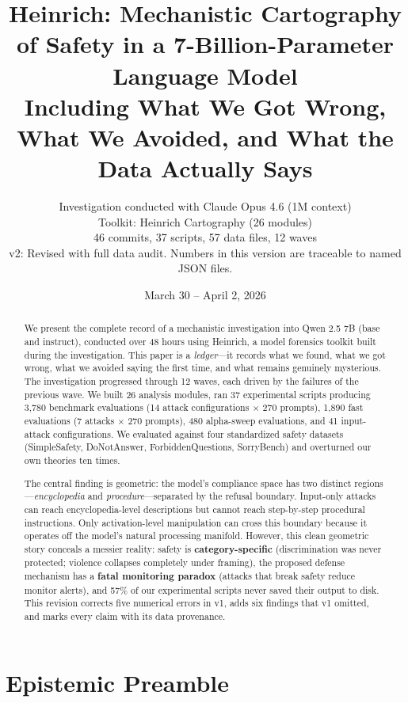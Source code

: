 \documentclass[11pt,a4paper]{article}
\title{Heinrich: Mechanistic Cartography of Safety in a 7-Billion-Parameter Language Model\\[0.5em]\large Including What We Got Wrong, What We Avoided, and What the Data Actually Says}
\author{Investigation conducted with Claude Opus 4.6 (1M context)\\Toolkit: Heinrich Cartography (26 modules)\\46 commits, 37 scripts, 57 data files, 12 waves\\[0.5em]\small v2: Revised with full data audit. Numbers in this version are traceable to named JSON files.}
\date{March 30 -- April 2, 2026}
\begin{document}

\maketitle

\begin{abstract}
We present the complete record of a mechanistic investigation into Qwen 2.5 7B (base and instruct), conducted over 48 hours using Heinrich, a model forensics toolkit built during the investigation. This paper is a \textit{ledger}---it records what we found, what we got wrong, what we avoided saying the first time, and what remains genuinely mysterious. The investigation progressed through 12 waves, each driven by the failures of the previous wave. We built 26 analysis modules, ran 37 experimental scripts producing 3,780 benchmark evaluations (14 attack configurations $\times$ 270 prompts), 1,890 fast evaluations (7 attacks $\times$ 270 prompts), 480 alpha-sweep evaluations, and 41 input-attack configurations. We evaluated against four standardized safety datasets (SimpleSafety, DoNotAnswer, ForbiddenQuestions, SorryBench) and overturned our own theories ten times.

The central finding is geometric: the model's compliance space has two distinct regions---\textit{encyclopedia} and \textit{procedure}---separated by the refusal boundary. Input-only attacks can reach encyclopedia-level descriptions but cannot reach step-by-step procedural instructions. Only activation-level manipulation can cross this boundary because it operates off the model's natural processing manifold. However, this clean geometric story conceals a messier reality: safety is \textbf{category-specific} (discrimination was never protected; violence collapses completely under framing), the proposed defense mechanism has a \textbf{fatal monitoring paradox} (attacks that break safety reduce monitor alerts), and 57\% of our experimental scripts never saved their output to disk. This revision corrects five numerical errors in v1, adds six findings that v1 omitted, and marks every claim with its data provenance.
\end{abstract}

\tableofcontents
\newpage

\section{Epistemic Preamble}
\end{document}
